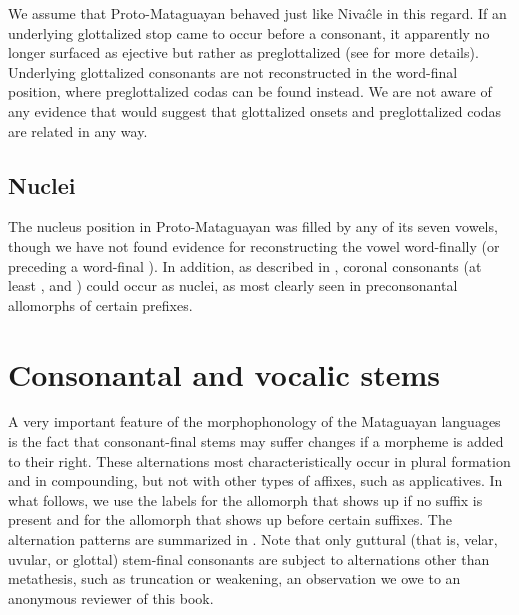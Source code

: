 We assume that Proto-Mataguayan behaved just like Nivaĉle in this regard. If an underlying glottalized stop came to occur before a consonant, it apparently no longer surfaced as ejective but rather as preglottalized (see  for more details). Underlying glottalized consonants are not reconstructed in the word-final position, where preglottalized codas can be found instead. We are not aware of any evidence that would suggest that glottalized onsets and preglottalized codas are related in any way.

\subsection{Nuclei}\label{nuclei}

The nucleus position in Proto-Mataguayan was filled by any of its seven vowels, though we have not found evidence for reconstructing the vowel  word-finally (or preceding a word-final ). In addition, as described in , coronal consonants (at least ,  and ) could occur as nuclei, as most clearly seen in preconsonantal allomorphs of certain prefixes.

\section{Consonantal and vocalic stems}\label{c-v-stems}

A very important feature of the morphophonology of the Mataguayan languages is the fact that consonant-final stems may suffer changes if a morpheme is added to their right. These alternations most characteristically occur in plural formation and in compounding, but not with other types of affixes, such as applicatives. In what follows, we use the labels  for the allomorph that shows up if no suffix is present and  for the allomorph that shows up before certain suffixes. The alternation patterns are summarized in . Note that only guttural (that is, velar, uvular, or glottal) stem-final consonants are subject to alternations other than metathesis, such as truncation or weakening, an observation we owe to an anonymous reviewer of this book.

